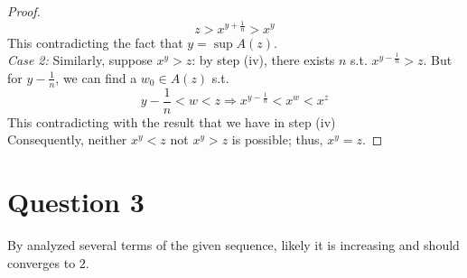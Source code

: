 \documentclass{article}
\begin{document}
\begin{proof}
    \[ z > x^{y + \frac{1}{n}} > x^{y} \]
    This contradicting the fact that $y = \sup A(z)$.
    \\
    \textit{Case 2: }
    Similarly, suppose $x^y > z$: by step (iv), there exists $n$ s.t. $x^{y - \frac{1}{n}} > z$. But for $y - \frac{1}{n}$, we can find a $w_0 \in A(z)$ s.t.
    \[ y - \frac{1}{n} < w < z \Rightarrow x^{y - \frac{1}{n}} < x^w < x^z \]
    This contradicting with the result that we have in step (iv)
    \\
    Consequently, neither $x^y < z$ not $x^y > z$ is possible; thus, $x^y = z$.
\end{proof}

\section*{Question 3}
By analyzed several terms of the given sequence, likely it is increasing and should converges to $2$.
\end{document}
